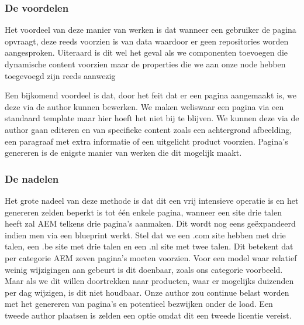 \documentclass{article}
\begin{document}
	\subsubsection{De voordelen}
    Het voordeel van deze manier van werken is dat wanneer een gebruiker de pagina opvraagt, deze reeds voorzien is van data waardoor er geen repositories worden aangesproken. Uiteraard is dit wel het geval als we componenten toevoegen die dynamische content voorzien maar de properties die we aan onze node hebben toegevoegd zijn reeds aanwezig
    \par
     Een bijkomend voordeel is dat, door het feit dat er een pagina aangemaakt is, we deze via de author kunnen bewerken. We maken weliswaar een pagina via een standaard template maar hier hoeft het niet bij te blijven. We kunnen deze via de author gaan editeren en van specifieke content zoals een achtergrond afbeelding, een paragraaf met extra informatie of een uitgelicht product voorzien. Pagina's genereren is de enigste manier van werken die dit mogelijk maakt.
	\subsubsection{De nadelen}
    Het grote nadeel van deze methode is dat dit een vrij intensieve operatie is en het genereren zelden beperkt is tot één enkele pagina, wanneer een site drie talen heeft zal AEM telkens drie pagina's aanmaken. Dit wordt nog eens geëxpandeerd indien men via een blueprint werkt. Stel dat we een .com site hebben met drie talen, een .be site met drie talen en een .nl site met twee talen. Dit betekent dat per categorie AEM zeven pagina's moeten voorzien. Voor een model waar relatief weinig wijzigingen aan gebeurt is dit doenbaar, zoals ons categorie voorbeeld. Maar als we dit willen doortrekken naar producten, waar er mogelijks duizenden per dag wijzigen, is dit niet houdbaar. Onze author zou continue belast worden met het genereren van pagina's en potentieel bezwijken onder de load. Een tweede author plaatsen is zelden een optie omdat dit een tweede licentie vereist.
\end{document}
